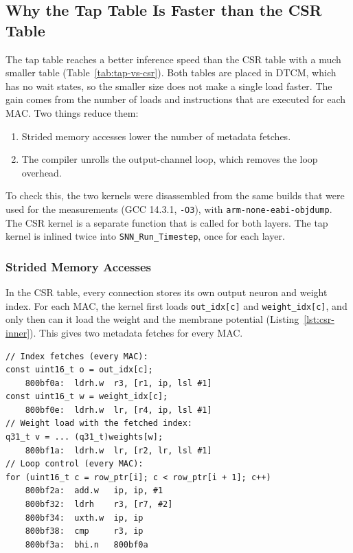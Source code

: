\subsection{Why the Tap Table Is Faster than the CSR Table}
\label{sec:tap-vs-csr}

The tap table reaches a better inference speed than the CSR table with a much smaller table
(Table~\ref{tab:tap-vs-csr}). Both tables are placed in DTCM, which has no wait states, so the
smaller size does not make a single load faster. The gain comes from the number of loads and
instructions that are executed for each MAC. Two things reduce them:
\begin{enumerate}
    \item Strided memory accesses lower the number of metadata fetches.
    \item The compiler unrolls the output-channel loop, which removes the loop overhead.
\end{enumerate}
To check this, the two kernels were disassembled from the same builds that were used for the
measurements (GCC 14.3.1, \texttt{-O3}), with \texttt{arm-none-eabi-objdump}. The CSR kernel is
a separate function that is called for both layers. The tap kernel is inlined twice into
\texttt{SNN\_Run\_Timestep}, once for each layer.

\subsubsection*{Strided Memory Accesses}

In the CSR table, every connection stores its own output neuron and weight index. For each MAC,
the kernel first loads \texttt{out\_idx[c]} and \texttt{weight\_idx[c]}, and only then can it load
the weight and the membrane potential (Listing~\ref{lst:csr-inner}). This gives two metadata
fetches for every MAC.

\begin{lstlisting}[basicstyle=\ttfamily\scriptsize, columns=fullflexible, keepspaces=true,
    frame=single, caption={CSR kernel: index fetches and loop control, both for every MAC.},
    label={lst:csr-inner}]
// Index fetches (every MAC):
const uint16_t o = out_idx[c];
    800bf0a:  ldrh.w  r3, [r1, ip, lsl #1]
const uint16_t w = weight_idx[c];
    800bf0e:  ldrh.w  lr, [r4, ip, lsl #1]
// Weight load with the fetched index:
q31_t v = ... (q31_t)weights[w];
    800bf1a:  ldrh.w  lr, [r2, lr, lsl #1]
// Loop control (every MAC):
for (uint16_t c = row_ptr[i]; c < row_ptr[i + 1]; c++)
    800bf2a:  add.w   ip, ip, #1
    800bf32:  ldrh    r3, [r7, #2]
    800bf34:  uxth.w  ip, ip
    800bf38:  cmp     r3, ip
    800bf3a:  bhi.n   800bf0a
\end{lstlisting}

